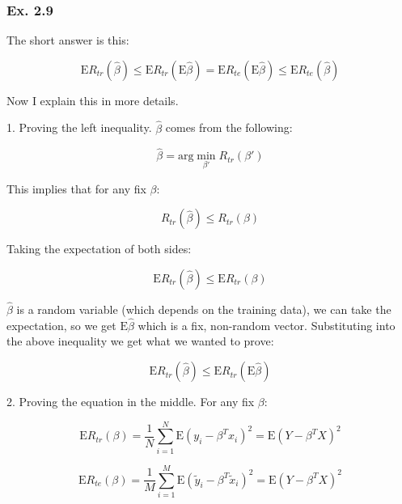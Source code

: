 \documentclass{article}
\begin{document}
\subsubsection{Ex. 2.9}

The short answer is this:

\begin{equation}
    \text{E}R_{tr}(\hat{\beta}) \le \text{E} R_{tr} (\text{E} \hat{\beta}) = \text{E} R_{te} (\text{E} \hat{\beta}) \le \text{E}R_{te}(\hat{\beta})
\end{equation}

Now I explain this in more details.

1. Proving the left inequality. $\hat{\beta}$ comes from the following:

\begin{equation}
    \hat{\beta} = \text{arg} \min_{\beta'} R_{tr}(\beta')
\end{equation}

This implies that for any fix $\beta$:

\begin{equation}
    R_{tr} (\hat{\beta}) \le R_{tr} (\beta)
\end{equation}

Taking the expectation of both sides:

\begin{equation}
    \text{E} R_{tr} (\hat{\beta}) \le \text{E} R_{tr} (\beta)
\end{equation}

$\hat{\beta}$ is a random variable (which depends on the training data), we can take the expectation, so we get $\text{E}\hat{\beta}$ which is a fix, non-random vector. Substituting into the above inequality we get what we wanted to prove:

\begin{equation}
    \text{E} R_{tr} (\hat{\beta}) \le \text{E} R_{tr} (\text{E}\hat{\beta})
\end{equation}


2. Proving the equation in the middle. For any fix $\beta$:

\begin{equation}
    \text{E} R_{tr} (\beta) = \frac 1N \sum_{i=1}^{N} \text{E} (y_i - \beta^{T} x_i) ^{2} = \text{E} (Y - \beta^{T} X)^{2}
\end{equation}

\begin{equation}
    \text{E} R_{te} (\beta) = \frac 1M \sum_{i=1}^{M} \text{E} (\widetilde{y}_i - \beta^{T} \widetilde{x}_i) ^{2} = \text{E} (Y - \beta^{T} X)^{2}
\end{equation}
\end{document}

